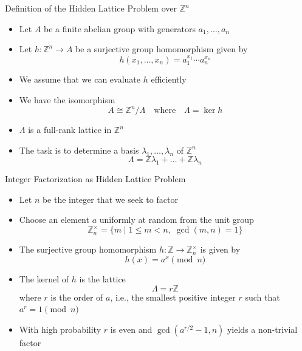 \documentclass{beamer}
\newcommand{\Z}{\mathbb{Z}}
\renewcommand{\>}{\rangle}
\newcommand{\<}{\langle}
\begin{document}

\begin{frame}{Definition of the Hidden Lattice Problem over $\Z^n$}

\begin{itemize}
\item
Let $A$ be a finite abelian group with generators $a_1,\ldots,a_n$

\medskip
\item Let $h : \Z^n \rightarrow A$ be a surjective group homomorphism given by
\[
h(x_1,\ldots,x_n) = a_1^{x_1} \cdots a_n^{x_n}
\] 

\item We assume that we can evaluate $h$ efficiently
\medskip
\item We have the isomorphism
\[
A \cong \Z^n / \Lambda \quad\mbox{where}\quad \Lambda=\ker h
\]

\item $\Lambda$ is a full-rank lattice in $\Z^n$

\medskip
\item The task is to determine a basis $\lambda_1,\ldots,\lambda_n$ of $\Z^n$
\[
\Lambda = \Z \lambda_1 + \ldots + \Z \lambda_n
\]
\end{itemize}

\end{frame}


\begin{frame}{Integer Factorization as Hidden Lattice Problem}

\begin{itemize}
\item Let $n$ be the integer that we seek to factor

\medskip
\item Choose an element $a$ uniformly at random from the unit group  
\[
\Z_n^\times=\{m \mid 1\le m < n, \; \gcd(m,n)=1\}
\]

\medskip
\item The surjective group homomorphism $h : \Z \rightarrow \Z_n^\times$ is given by 
\[
h(x) = a^x \pmod{n}
\]

\medskip
\item The kernel of $h$ is the lattice
\[
\Lambda = r \Z
\]
where $r$ is the order of $a$, i.e., the smallest positive integer $r$ such that $a^r=1 \pmod{n}$

\medskip
\item With high probability $r$ is even and $\gcd(a^{r/2}-1,n)$ yields a non-trivial factor
\end{itemize}

\end{frame}
\end{document}
